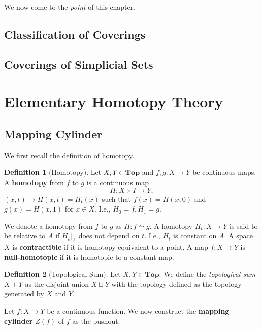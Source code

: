 \documentclass{article}
\theoremstyle{definition}
\newtheorem{defn}{Definition}[section]
\newcommand{\cat}[1]{\mathbf{#1}}
\begin{document}
We now come to the \textit{point} of this chapter.
\subsection{Classification of Coverings}
\subsection{Coverings of Simplicial Sets}
\section{Elementary Homotopy Theory}
\subsection{Mapping Cylinder}
We first recall the definition of homotopy.
\begin{defn}[Homotopy]
Let $X,Y\in\cat{Top}$ and $f,g:X\rightarrow Y$ be continuous maps. A \textbf{homotopy} from $f$ to $g$ is a continuous map
\[H:X\times I\rightarrow Y,\] $(x,t)\rightarrow H(x,t)=H_{t}(x)$ such that $f(x)=H(x,0)$ and $g(x)=H(x,1)$ for $x\in X$. I.e., $H_{0}=f,H_{1}=g.$
\end{defn}
We denote a homotopy from $f$ to $g$ as $H:f\simeq g.$ A homotopy $H_{t}:X\rightarrow Y$ is said to be relative to $A$ if $H_{t}|_{A}$ does not depend on $t$. I.e., $H_{t}$ is constant on $A$. A space $X$ is \textbf{contractible} if it is homotopy equivalent to a point. A map $f:X\rightarrow Y$ is \textbf{null-homotopic} if it is homotopic to a constant map. 
\begin{defn}[Topological Sum]
Let $X,Y\in\cat{Top}$. We define the \textit{topological sum} $X+Y$ as the disjoint union $X\sqcup Y$ with the topology defined as the topology generated by $X$ and $Y$.
\end{defn}
Let $f:X\rightarrow Y$ be a continuous function. We now construct the \textbf{mapping cylinder} $Z(f)$ of $f$ as the pushout:
\end{document}
